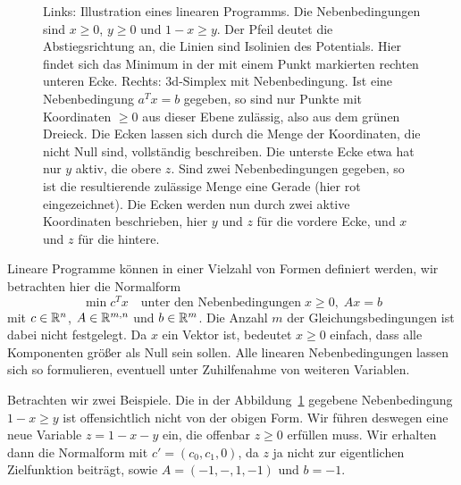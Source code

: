 \begin{figure}
  \caption{Links: Illustration eines linearen Programms. Die
    Nebenbedingungen sind $x\ge 0$, $y\ge 0$ und $1 - x \ge y$. Der
    Pfeil deutet die Abstiegsrichtung an, die Linien sind Isolinien
    des Potentials. Hier findet sich das Minimum in der mit einem
    Punkt markierten rechten unteren Ecke. Rechts: 3d-Simplex mit
    Nebenbedingung. Ist eine Nebenbedingung $a^Tx=b$ gegeben, so sind
    nur Punkte mit Koordinaten $\ge 0$ aus dieser Ebene zulässig, also
    aus dem grünen Dreieck. Die Ecken lassen sich durch die Menge der
    Koordinaten, die nicht Null sind, vollständig beschreiben. Die
    unterste Ecke etwa hat nur $y$ aktiv, die obere $z$. Sind zwei
    Nebenbedingungen gegeben, so ist die resultierende zulässige Menge
    eine Gerade (hier rot eingezeichnet). Die Ecken werden nun durch
    zwei aktive Koordinaten beschrieben, hier $y$ und $z$ für die
    vordere Ecke, und $x$ und $z$ für die hintere.}
  \label{fig:simplex}
\end{figure}

Lineare Programme können in einer Vielzahl von Formen definiert
werden, wir betrachten hier die Normalform
\begin{equation}
  \label{eq:simplexprob}
  \min c^Tx \quad\text{unter den Nebenbedingungen}\; x\ge 0,\;Ax=b
\end{equation}
mit $c\in\mathbb{R}^n$, $A\in\mathbb{R}^{m,n}$ und $b\in\mathbb{R}^{m}$. Die Anzahl $m$ der
Gleichungsbedingungen ist dabei nicht festgelegt. Da $x$ ein Vektor
ist, bedeutet $x\ge 0$ einfach, dass alle Komponenten größer als Null
sein sollen. Alle linearen Nebenbedingungen lassen sich so
formulieren, eventuell unter Zuhilfenahme von weiteren Variablen.

Betrachten wir zwei Beispiele. Die in der Abbildung~\ref{fig:simplex}
gegebene Nebenbedingung $1 - x \ge y$ ist offensichtlich nicht von der
obigen Form. Wir führen deswegen eine neue Variable $z=1-x-y$ ein, die
offenbar $z\ge 0$ erfüllen muss. Wir erhalten dann die Normalform mit
$c'=(c_0, c_1, 0)$, da $z$ ja nicht zur eigentlichen Zielfunktion
beiträgt, sowie $A=(-1,-,1, -1)$ und $b=-1$.

